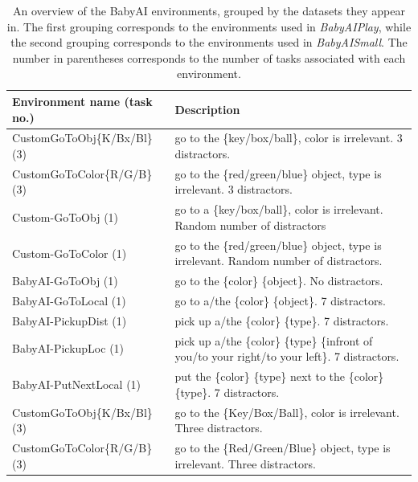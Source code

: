 \documentclass[../main.tex]{subfiles}
\begin{document}
\begin{table}[tb]
	\centering
	\caption[Overview of the BabyAI environments and tasks]{An overview of the BabyAI environments,
		grouped by the datasets they appear in. The first grouping corresponds to the environments used
		in \textit{BabyAIPlay}, while the second grouping corresponds to the environments used in
		\textit{BabyAISmall}. The number in parentheses corresponds to the number of tasks associated
		with each environment.}
	\label{tab:babyai-tasks}
	\begin{tabularx}{\textwidth}{@{}XX@{}}
		\toprule[1.5pt]
		\textbf{Environment name (task no.)} & \textbf{Description}                                                        \\ \midrule
		CustomGoToObj\{K/Bx/Bl\} (3)         & go to the \{key/box/ball\}, color is irrelevant. 3 distractors.             \\
		CustomGoToColor\{R/G/B\} (3)         & go to the \{red/green/blue\} object, type is irrelevant.
		3 distractors.                                                                                                     \\
		Custom-GoToObj (1)                   & go to a \{key/box/ball\}, color is irrelevant. Random number of distractors \\
		Custom-GoToColor (1)                 & go to the \{red/green/blue\} object, type is irrelevant.
		Random number of distractors.                                                                                      \\
		BabyAI-GoToObj (1)                   & go to the \{color\} \{object\}. No distractors.                             \\
		BabyAI-GoToLocal (1)                 & go to a/the \{color\} \{object\}. 7 distractors.                            \\
		BabyAI-PickupDist (1)                & pick up a/the \{color\} \{type\}. 7 distractors.                            \\
		BabyAI-PickupLoc (1)                 & pick up a/the \{color\} \{type\} \{infront of you/to your
		right/to your left\}. 7 distractors.                                                                               \\
		BabyAI-PutNextLocal (1)              & put the \{color\} \{type\} next to the \{color\}
		\{type\}. 7 distractors.                                                                                           \\ \midrule
		CustomGoToObj\{K/Bx/Bl\} (3)         & go to the \{Key/Box/Ball\}, color is irrelevant. Three distractors.         \\
		CustomGoToColor\{R/G/B\} (3)         & go to the \{Red/Green/Blue\} object, type is irrelevant.
		Three distractors.                                                                                                 \\ \bottomrule[1.5pt]
	\end{tabularx}
\end{table}
\end{document}
